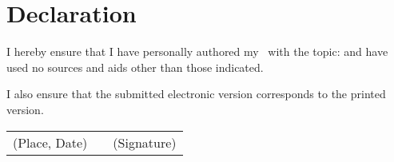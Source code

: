 \clearpage

\thispagestyle{kapitelkopfzeile}

\chapter*{Declaration}

I hereby ensure that I have personally authored my \typMeinerArbeit\ with the topic: \emph{\themaMeinerArbeit} and have used no sources and aids other than those indicated.

I also ensure that the submitted electronic version corresponds to the printed version. 

\vspace{3cm}

\begin{center}
\begin{tabular}{ccc}
(Place, Date) & \hspace{0.3\linewidth} & (Signature)
\end{tabular}
\end{center}